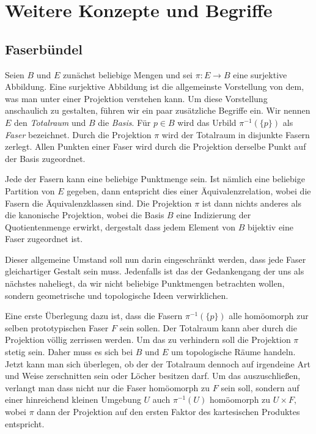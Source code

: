 

\chapter{Weitere Konzepte und Begriffe}

\section{Faserbündel}

Seien $B$ und $E$ zunächst beliebige Mengen und sei $\pi\colon E\to B$
eine surjektive Abbildung. Eine surjektive Abbildung ist die allgemeinste
Vorstellung von dem, was man unter einer Projektion verstehen kann.
Um diese Vorstellung anschaulich zu gestalten, führen wir ein paar
zusätzliche Begriffe ein. Wir nennen $E$ den \emph{Totalraum} und $B$
die \emph{Basis}. Für $p\in B$ wird das Urbild $\pi^{-1}(\{p\})$ als
\emph{Faser} bezeichnet. Durch die Projektion $\pi$ wird der Totalraum
in disjunkte Fasern zerlegt. Allen Punkten einer Faser wird durch
die Projektion derselbe Punkt auf der Basis zugeordnet.

Jede der Fasern kann eine beliebige Punktmenge sein. Ist nämlich eine
beliebige Partition von $E$ gegeben, dann entspricht dies einer
Äquivalenzrelation, wobei die Fasern die Äquivalenzklassen sind.
Die Projektion $\pi$ ist dann nichts anderes als die kanonische
Projektion, wobei die Basis $B$ eine Indizierung der Quotientenmenge
erwirkt, dergestalt dass jedem Element von $B$ bijektiv eine Faser
zugeordnet ist.

Dieser allgemeine Umstand soll nun darin eingeschränkt werden, dass
jede Faser gleichartiger Gestalt sein muss. Jedenfalls ist das der
Gedankengang der uns als nächstes naheliegt, da wir nicht beliebige
Punktmengen betrachten wollen, sondern geometrische und topologische
Ideen verwirklichen.

Eine erste Überlegung dazu ist, dass die Fasern $\pi^{-1}(\{p\})$ alle
homöomorph zur selben prototypischen Faser $F$ sein sollen. Der
Totalraum kann aber durch die Projektion völlig zerrissen werden.
Um das zu verhindern soll die Projektion $\pi$ stetig sein. Daher muss
es sich bei $B$ und $E$ um topologische Räume handeln. Jetzt kann man
sich überlegen, ob der der Totalraum dennoch auf irgendeine Art und
Weise zerschnitten sein oder Löcher besitzen darf. Um das auszuschließen,
verlangt man dass nicht nur die Faser homöomorph zu $F$ sein soll,
sondern auf einer hinreichend kleinen Umgebung $U$ auch
$\pi^{-1}(U)$ homöomorph zu $U\times F$, wobei $\pi$ dann der
Projektion auf den ersten Faktor des kartesischen Produktes
entspricht.

